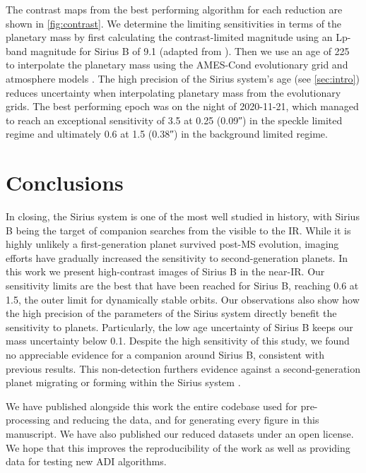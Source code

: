 \documentclass[twocolumn]{aastex631}
\begin{document}
The contrast maps from the best performing algorithm for each reduction are shown in \autoref{fig:contrast}. We determine the limiting sensitivities in terms of the planetary mass by first calculating the contrast-limited magnitude using an Lp-band magnitude for Sirius B of 9.1 (adapted from \citealp{bonnet-bidaud_adonis_2008}). Then we use an age of \qty{225}{\mega\year} to interpolate the planetary mass using the AMES-Cond evolutionary grid and atmosphere models \citep{allard_models_2012}. The high precision of the Sirius system's age (see \autoref{sec:intro}) reduces uncertainty when interpolating planetary mass from the evolutionary grids. The best performing epoch was on the night of 2020-11-21, which managed to reach an exceptional sensitivity of \qty{3.5}{\jupitermass} at \qty{0.25}{\au} (\ang{;;0.09}) in the speckle limited regime and ultimately \qty{0.6}{\jupitermass} at \qty{1.5}{\au} (\ang{;;0.38}) in the background limited regime.

\section{Conclusions} \label{sec:conclusion}

In closing, the Sirius system is one of the most well studied in history, with Sirius B being the target of companion searches from the visible to the IR. While it is highly unlikely a first-generation planet survived post-MS evolution, imaging efforts have gradually increased the sensitivity to second-generation planets. In this work we present high-contrast images of Sirius B in the near-IR. Our sensitivity limits are the best that have been reached for Sirius B, reaching \qty{0.6}{\jupitermass} at \qty{1.5}{\au}, the outer limit for dynamically stable orbits. Our observations also show how the high precision of the parameters of the Sirius system directly benefit the sensitivity to planets. Particularly, the low age uncertainty of Sirius B keeps our mass uncertainty below \qty{0.1}{\jupitermass}. Despite the high sensitivity of this study, we found no appreciable evidence for a companion around Sirius B, consistent with previous results. This non-detection furthers evidence against a second-generation planet migrating or forming within the Sirius system \citep{vigan_high-contrast_2015}.

We have published alongside this work the entire codebase used for pre-processing and reducing the data, and for generating every figure in this manuscript. We have also published our reduced datasets under an open license. We hope that this improves the reproducibility of the work as well as providing data for testing new ADI algorithms.
\end{document}
